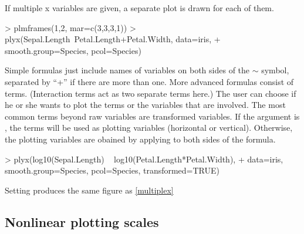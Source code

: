\documentclass[11pt]{article}
\begin{document}
If multiple x variables are given, a separate plot is drawn for each of them.
\begin{Schunk}
\begin{Sinput}
> plmframes(1,2, mar=c(3,3,3,1))
> plyx(Sepal.Length~Petal.Length+Petal.Width, data=iris, 
+      smooth.group=Species, pcol=Species)
\end{Sinput}
\end{Schunk}


Simple formulas just include names of variables on both sides of the $\sim$
symbol, separated by ``+'' if there are more than one. 
More advanced formulas consist of terms.
(Interaction terms act as two separate terms here.)
The user can choose if he or she wants to plot the terms or the variables
that are involved. 
The most common terms beyond raw variables are transformed variables.
If the argument  is , the terms will be used as
plotting variables (horizontal or vertical). 
Otherwise, the plotting variables are obained by applying  to
both sides of the formula.

\begin{Schunk}
\begin{Sinput}
>   plyx(log10(Sepal.Length) ~ log10(Petal.Length*Petal.Width), 
+        data=iris, smooth.group=Species, pcol=Species, transformed=TRUE)
\end{Sinput}
\end{Schunk}

Setting  produces the same figure as
\ref{multiplex}


\subsection{Nonlinear plotting scales}
\end{document}
